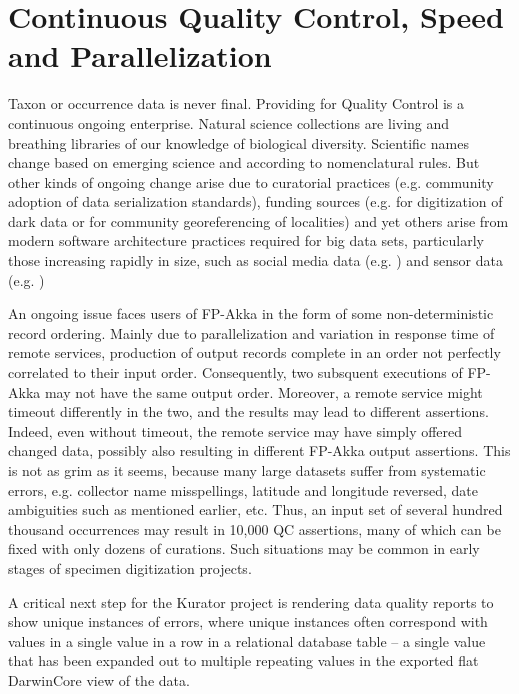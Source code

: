 \documentclass{article}
\begin{document}



\section{Continuous Quality Control, Speed and Parallelization}
Taxon or occurrence data is never final. Providing for Quality Control is a continuous ongoing enterprise. Natural science collections are living and breathing libraries of our knowledge of biological diversity.  Scientific names change based on emerging science and according to nomenclatural rules.  But other kinds of ongoing change arise due to curatorial practices (e.g. community adoption of data serialization standards), funding sources (e.g. for digitization of dark data or for community georeferencing of localities) and yet others arise from modern software architecture practices required for big data sets, particularly those increasing rapidly in size, such as social media data (e.g.\citep{Cai2015, Immonen2015} ) and sensor data (e.g. \citep{Campbell01072013})

An ongoing issue faces users of FP-Akka in the form of some non-deterministic record ordering.  Mainly due to parallelization and variation in response time of remote services, production of output records complete in an order not perfectly correlated to their input order. Consequently,  two subsquent executions of FP-Akka may not have the same output order. Moreover, a remote service might timeout differently in the two, and the results may lead to different assertions.  Indeed, even without timeout, the remote service may have simply offered changed data, possibly also resulting in different FP-Akka output assertions.  This is not as grim as it seems, because many large datasets suffer from systematic errors, e.g. collector name misspellings, latitude and longitude reversed, date ambiguities such as mentioned earlier, etc.  Thus, an input set of several hundred thousand occurrences may result in 10,000 QC assertions, many of which can be fixed with only dozens of curations. Such situations may be common in early stages of specimen digitization projects.

A critical next step for the Kurator project is rendering data quality reports to show unique instances of errors, where unique instances often correspond with values in a single value in a row in a relational database table – a single value that has been expanded out to multiple repeating values in the exported flat DarwinCore view of the data.  
\end{document}
